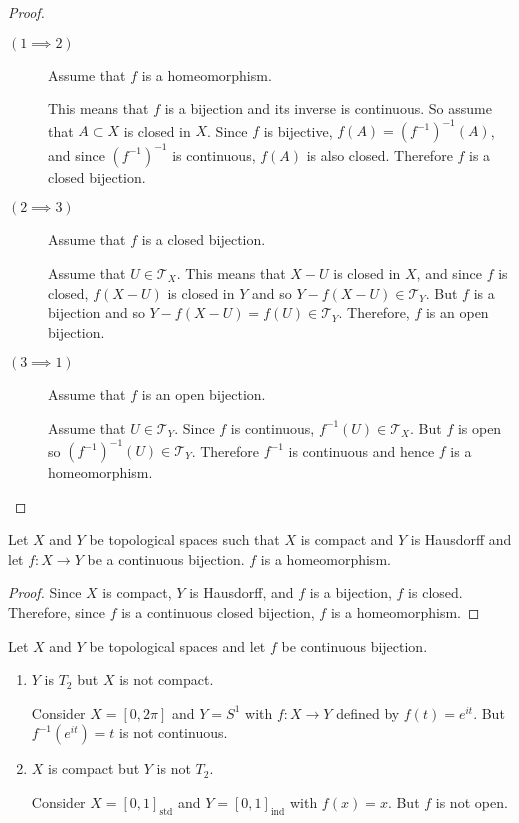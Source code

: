 \documentclass[letterpaper,12pt,fleqn]{article}
\newcommand{\T}{\mathscr{T}}
\begin{document}
\begin{proof}
  \begin{description}
  \item[]
  \item[\((1\implies 2)\)] Assume that \(f\) is a homeomorphism.

    This means that \(f\) is a bijection and its inverse is continuous.  So assume that \(A\subset X\) is closed in
    \(X\). Since \(f\) is bijective, \(f(A)=(f^{-1})^{-1}(A)\), and since \((f^{-1})^{-1}\) is continuous, \(f(A)\)
    is also closed.  Therefore \(f\) is a closed bijection.

  \item[\((2\implies 3)\)] Assume that \(f\) is a closed bijection.

    Assume that \(U\in\T_X\).  This means that \(X-U\) is closed in \(X\), and since \(f\) is closed, \(f(X-U)\)
    is closed in \(Y\) and so \(Y-f(X-U)\in\T_Y\).  But \(f\) is a bijection and so \(Y-f(X-U)=f(U)\in\T_Y\).
    Therefore, \(f\) is an open bijection.

  \item[\((3\implies 1)\)] Assume that \(f\) is an open bijection.

    Assume that \(U\in\T_Y\).  Since \(f\) is continuous, \(f^{-1}(U)\in\T_X\).  But \(f\) is open so
    \((f^{-1})^{-1}(U)\in\T_Y\).  Therefore \(f^{-1}\) is continuous and hence \(f\) is a homeomorphism.
  \end{description}
\end{proof}

\begin{theorem}
  Let \(X\) and \(Y\) be topological spaces such that \(X\) is compact and \(Y\) is Hausdorff and let \(f:X\to Y\)
  be a continuous bijection.  \(f\) is a homeomorphism.
\end{theorem}

\begin{proof}
  Since \(X\) is compact, \(Y\) is Hausdorff, and \(f\) is a bijection, \(f\) is closed.  Therefore, since \(f\) is
  a continuous closed bijection, \(f\) is a homeomorphism.
\end{proof}

\begin{example}
  Let \(X\) and \(Y\) be topological spaces and let \(f\) be continuous bijection.
  \begin{enumerate}
  \item \(Y\) is \(T_2\) but \(X\) is not compact.

    Consider \(X=[0,2\pi]\) and \(Y=S^1\) with \(f:X\to Y\) defined by \(f(t)=e^{it}\).  But \(f^{-1}(e^{it})=t\)
    is not continuous.

  \item \(X\) is compact but \(Y\) is not \(T_2\).

    Consider \(X=[0,1]_{\text{std}}\) and \(Y=[0,1]_{\text{ind}}\) with \(f(x)=x\).  But \(f\) is not open.
  \end{enumerate}
\end{example}
\end{document}
